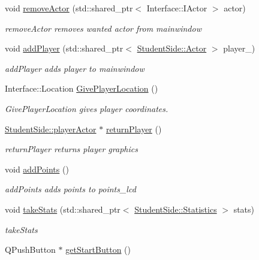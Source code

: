 \begin{DoxyCompactItemize}
void \hyperlink{class_student_side_1_1_mainwindow_a102accea72c9e12076876f82048f7ca1}{remove\-Actor} (std\-::shared\-\_\-ptr$<$ Interface\-::\-I\-Actor $>$ actor)
\begin{DoxyCompactList}\small\item\em remove\-Actor removes wanted actor from mainwindow \end{DoxyCompactList}\item 
void \hyperlink{class_student_side_1_1_mainwindow_ad97e4d9dd00a8d0b2b377f749504f98a}{add\-Player} (std\-::shared\-\_\-ptr$<$ \hyperlink{class_student_side_1_1_actor}{Student\-Side\-::\-Actor} $>$ player\-\_\-)
\begin{DoxyCompactList}\small\item\em add\-Player adds player to mainwindow \end{DoxyCompactList}\item 
Interface\-::\-Location \hyperlink{class_student_side_1_1_mainwindow_a487fd2b55286ec6c538c9bfbf8055dfb}{Give\-Player\-Location} ()
\begin{DoxyCompactList}\small\item\em Give\-Player\-Location gives player coordinates. \end{DoxyCompactList}\item 
\hyperlink{class_student_side_1_1player_actor}{Student\-Side\-::player\-Actor} $\ast$ \hyperlink{class_student_side_1_1_mainwindow_aa1eb590a67e0a49fd493c25ec20d189c}{return\-Player} ()
\begin{DoxyCompactList}\small\item\em return\-Player returns player graphics \end{DoxyCompactList}\item 
void \hyperlink{class_student_side_1_1_mainwindow_aed59f49514fa33ffdb6b77b0d0aa54f7}{add\-Points} ()
\begin{DoxyCompactList}\small\item\em add\-Points adds points to points\-\_\-lcd \end{DoxyCompactList}\item 
void \hyperlink{class_student_side_1_1_mainwindow_afa7eb3e3a86fab995d90d253015d3dc7}{take\-Stats} (std\-::shared\-\_\-ptr$<$ \hyperlink{class_student_side_1_1_statistics}{Student\-Side\-::\-Statistics} $>$ stats)
\begin{DoxyCompactList}\small\item\em take\-Stats \end{DoxyCompactList}\item 
Q\-Push\-Button $\ast$ \hyperlink{class_student_side_1_1_mainwindow_a0892eab493aace8eee0358c3d8e88d22}{get\-Start\-Button} ()

\end{DoxyCompactItemize}
